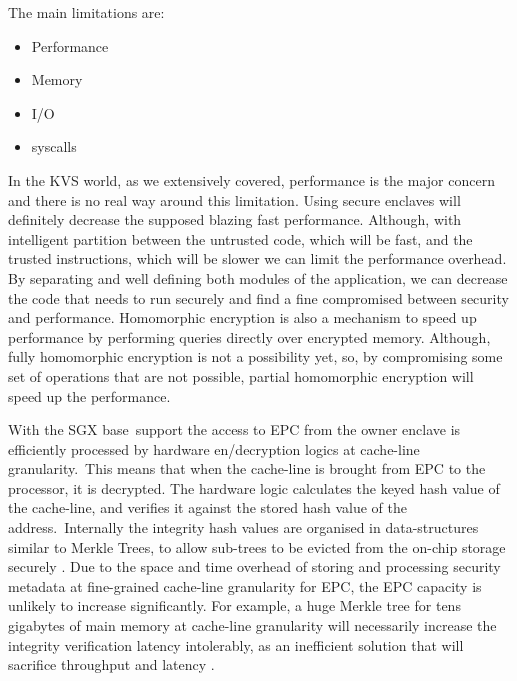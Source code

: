 The main limitations are: 

\begin{itemize}
	\item Performance
	\item Memory
	\item \gls{I/O}
	\item \glspl{syscall}
\end{itemize}

In the \gls{KVS} world, as we extensively covered, performance is the major concern and there is no real way around this limitation. Using secure enclaves will definitely decrease the supposed blazing fast performance. Although, with intelligent partition between the untrusted code, which will be fast, and the trusted instructions, which will be slower we can limit the performance overhead. By separating and well defining both modules of the application, we can decrease the code that needs to run securely and find a fine compromised between security and performance. Homomorphic encryption is also a mechanism to speed up performance by performing queries directly over encrypted memory. Although, fully homomorphic encryption is not a possibility yet, so, by compromising some set of operations that are not possible, partial homomorphic encryption will speed up the performance.

With the \gls{SGX} base support the access to \gls{EPC} from the owner enclave is efficiently processed by hardware en/decryption logics at cache-line granularity. This means that when the cache-line is brought from \gls{EPC} to the processor, it is decrypted. The hardware logic calculates the keyed hash value of the cache-line, and verifies it against the stored hash value of the address. Internally the integrity hash values are organised in data-structures similar to Merkle Trees, to allow sub-trees to be evicted from the on-chip storage securely \cite{cryptoeprint:2016:204}. Due to the space and time overhead of storing and processing security metadata at fine-grained cache-line granularity for \gls{EPC}, the \gls{EPC} capacity is unlikely to increase significantly. For example, a huge Merkle tree for tens gigabytes of main memory at cache-line granularity will necessarily increase the integrity verification latency intolerably, as an inefficient solution that will sacrifice throughput and latency \cite{Taassori2018VAULTRP}.

